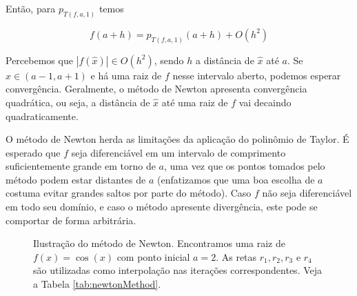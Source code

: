 \documentclass[]{article}
\numberwithin{equation}{section}
\begin{document}
Então, para $p_{T(f, a, 1)}$ temos

$$
f(a + h) = p_{T(f, a, 1)}(a + h) + O(h^2)
$$

Percebemos que $|f(\hat{x})|\in O(h^2)$, sendo $h$ a distância de
$\hat{x}$ até $a$. Se $\hat{x} \in (a - 1, a + 1)$ e há uma raiz de
$f$ nesse intervalo aberto, podemos esperar convergência. Geralmente,
o método de Newton apresenta convergência quadrática, ou seja, a
distância de $\hat{x}$ até uma raiz de $f$ vai decaindo
quadraticamente.

O método de Newton herda as limitações da aplicação do polinômio de
Taylor. É esperado que $f$ seja diferenciável em um intervalo de
comprimento suficientemente grande em torno de $a$, uma vez que os
pontos tomados pelo método podem estar distantes de $a$ (enfatizamos
que uma boa escolha de $a$ costuma evitar grandes saltos por parte do
método). Caso $f$ não seja diferenciável em todo seu domínio, e caso o
método apresente divergência, este pode se comportar de forma
arbitrária.

\begin{figure}[h]
  \centering
  \caption{Ilustração do método de Newton.  Encontramos uma raiz de
    $f(x) = \cos(x)$ com ponto inicial $a = 2$.  As retas
    $r_1, r_2, r_3$ e $r_4$ são utilizadas como interpolação nas
    iterações correspondentes.  Veja a Tabela \ref{tab:newtonMethod}.}
  \label{fig:newtonMethod}
\end{figure}
\end{document}

